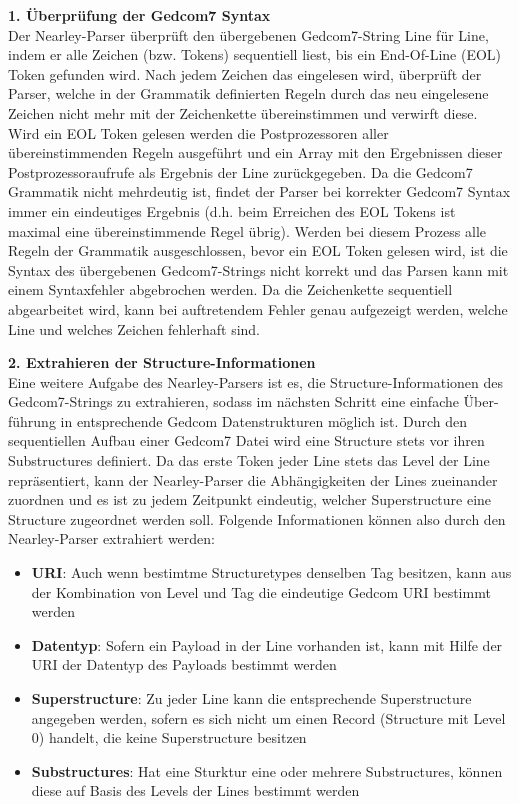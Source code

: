 \vspace{1em}
\textbf{1. Überprüfung der Gedcom7 Syntax} \vspace{0.35em} \\
Der Nearley-Parser überprüft den übergebenen Gedcom7-String Line für Line, indem er alle Zeichen (bzw. Tokens) sequentiell liest, bis ein End-Of-Line (EOL) Token  gefunden wird. Nach jedem Zeichen das eingelesen wird, überprüft der Parser, welche in der Grammatik definierten Regeln durch das neu eingelesene Zeichen nicht mehr mit der Zeichenkette übereinstimmen und verwirft diese. Wird ein EOL Token gelesen werden die Postprozessoren aller übereinstimmenden Regeln ausgeführt und ein Array mit den Ergebnissen dieser Postprozessoraufrufe als Ergebnis der Line zurückgegeben. Da die Gedcom7 Grammatik nicht mehrdeutig ist, findet der Parser bei korrekter Gedcom7 Syntax immer ein eindeutiges Ergebnis (d.h. beim Erreichen des EOL Tokens ist maximal eine übereinstimmende Regel übrig). Werden bei diesem Prozess alle Regeln der Grammatik ausgeschlossen, bevor ein EOL Token gelesen wird, ist die Syntax des übergebenen Gedcom7-Strings nicht korrekt und das Parsen kann mit einem Syntaxfehler abgebrochen werden. Da die Zeichenkette sequentiell abgearbeitet wird, kann bei auftretendem Fehler genau aufgezeigt werden, welche Line und welches Zeichen fehlerhaft sind.

\vspace{1em}
\textbf{2. Extrahieren der Structure-Informationen} \vspace{0.35em} \\
Eine weitere Aufgabe des Nearley-Parsers ist es, die Structure-Informationen des Gedcom7-Strings zu extrahieren, sodass im nächsten Schritt eine einfache Über-führung in entsprechende Gedcom Datenstrukturen möglich ist. Durch den sequentiellen Aufbau einer Gedcom7 Datei wird eine Structure stets vor ihren Substructures definiert. Da das erste Token jeder Line stets das Level der Line repräsentiert, kann der Nearley-Parser die Abhängigkeiten der Lines zueinander zuordnen und es ist zu jedem Zeitpunkt eindeutig, welcher Superstructure eine Structure zugeordnet werden soll. Folgende Informationen können also durch den Nearley-Parser extrahiert werden: 
\begin{itemize}
	\item \textbf{URI}: Auch wenn bestimtme Structuretypes denselben Tag besitzen, kann aus der Kombination von Level und Tag die eindeutige Gedcom URI bestimmt werden
	\item \textbf{Datentyp}: Sofern ein Payload in der Line vorhanden ist, kann mit Hilfe der URI der Datentyp des Payloads bestimmt werden
	\item \textbf{Superstructure}: Zu jeder Line kann die entsprechende Superstructure angegeben werden, sofern es sich nicht um einen Record (Structure mit Level 0) handelt, die keine Superstructure besitzen
	\item \textbf{Substructures}: Hat eine Sturktur eine oder mehrere Substructures, können diese auf Basis des Levels der Lines bestimmt werden
\end{itemize}

